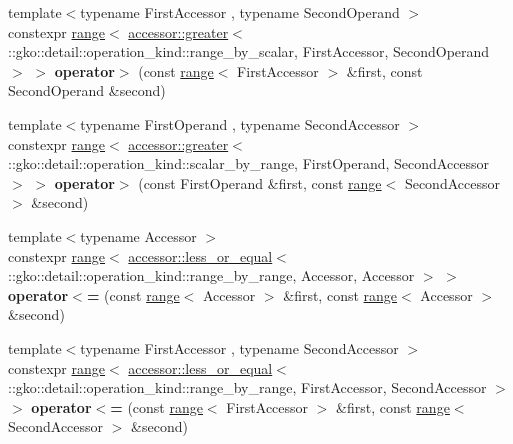 \begin{DoxyCompactItemize}
\item 
\mbox{\label{namespacegko_a3d7af1edcc3719e52f0f3b9519651d2d}} 
{\footnotesize template$<$typename First\+Accessor , typename Second\+Operand $>$ }\\constexpr \hyperlink{classgko_1_1range}{range}$<$ \hyperlink{structgko_1_1accessor_1_1greater}{accessor\+::greater}$<$ \+::gko\+::detail\+::operation\+\_\+kind\+::range\+\_\+by\+\_\+scalar, First\+Accessor, Second\+Operand $>$ $>$ {\bfseries operator$>$} (const \hyperlink{classgko_1_1range}{range}$<$ First\+Accessor $>$ \&first, const Second\+Operand \&second)
\item 
\mbox{\label{namespacegko_a8ea0e27f2e5baab0c073e4e6baff4b7e}} 
{\footnotesize template$<$typename First\+Operand , typename Second\+Accessor $>$ }\\constexpr \hyperlink{classgko_1_1range}{range}$<$ \hyperlink{structgko_1_1accessor_1_1greater}{accessor\+::greater}$<$ \+::gko\+::detail\+::operation\+\_\+kind\+::scalar\+\_\+by\+\_\+range, First\+Operand, Second\+Accessor $>$ $>$ {\bfseries operator$>$} (const First\+Operand \&first, const \hyperlink{classgko_1_1range}{range}$<$ Second\+Accessor $>$ \&second)
\item 
\mbox{\label{namespacegko_a41355e557a67620659b116f79ba7074d}} 
{\footnotesize template$<$typename Accessor $>$ }\\constexpr \hyperlink{classgko_1_1range}{range}$<$ \hyperlink{structgko_1_1accessor_1_1less__or__equal}{accessor\+::less\+\_\+or\+\_\+equal}$<$ \+::gko\+::detail\+::operation\+\_\+kind\+::range\+\_\+by\+\_\+range, Accessor, Accessor $>$ $>$ {\bfseries operator$<$=} (const \hyperlink{classgko_1_1range}{range}$<$ Accessor $>$ \&first, const \hyperlink{classgko_1_1range}{range}$<$ Accessor $>$ \&second)
\item 
\mbox{\label{namespacegko_aff69ca2e7cb612911bd85ae82bf0c0b8}} 
{\footnotesize template$<$typename First\+Accessor , typename Second\+Accessor $>$ }\\constexpr \hyperlink{classgko_1_1range}{range}$<$ \hyperlink{structgko_1_1accessor_1_1less__or__equal}{accessor\+::less\+\_\+or\+\_\+equal}$<$ \+::gko\+::detail\+::operation\+\_\+kind\+::range\+\_\+by\+\_\+range, First\+Accessor, Second\+Accessor $>$ $>$ {\bfseries operator$<$=} (const \hyperlink{classgko_1_1range}{range}$<$ First\+Accessor $>$ \&first, const \hyperlink{classgko_1_1range}{range}$<$ Second\+Accessor $>$ \&second)

\end{DoxyCompactItemize}
